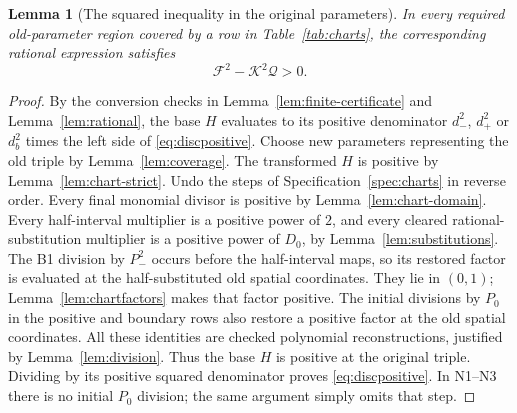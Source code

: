 \documentclass[11pt,a4paper]{article}
\newtheorem{lemma}{Lemma}[section]
\theoremstyle{definition}
\newcommand{\E}[2]{\refstepcounter{equation}\[#2\tag{\theequation}\label{eq:#1}\]}
\begin{document}
\begin{lemma}[The squared inequality in the original parameters]\label{lem:disc-positive}
In every required old-parameter region covered by a row in Table~\ref{tab:charts}, the corresponding rational expression satisfies
\E{discpositive}{\mathcal F^2-\mathcal K^2\mathcal Q>0.}
\end{lemma}
\begin{proof}
By the conversion checks in Lemma~\ref{lem:finite-certificate} and Lemma~\ref{lem:rational}, the base $H$ evaluates to its positive denominator $d_-^2$, $d_+^2$ or $d_b^2$ times the left side of \eqref{eq:discpositive}.
Choose new parameters representing the old triple by Lemma~\ref{lem:coverage}. The transformed $H$ is positive by Lemma~\ref{lem:chart-strict}. Undo the steps of Specification~\ref{spec:charts} in reverse order. Every final monomial divisor is positive by Lemma~\ref{lem:chart-domain}. Every half-interval multiplier is a positive power of $2$, and every cleared rational-substitution multiplier is a positive power of $D_0$, by Lemma~\ref{lem:substitutions}. The B1 division by $P_-^2$ occurs before the half-interval maps, so its restored factor is evaluated at the half-substituted old spatial coordinates. They lie in $(0,1)$; Lemma~\ref{lem:chartfactors} makes that factor positive.
The initial divisions by $P_0$ in the positive and boundary rows also restore a positive factor at the old spatial coordinates. All these identities are checked polynomial reconstructions, justified by Lemma~\ref{lem:division}. Thus the base $H$ is positive at the original triple. Dividing by its positive squared denominator proves \eqref{eq:discpositive}. In N1--N3 there is no initial $P_0$ division; the same argument simply omits that step.
\end{proof}
\end{document}

